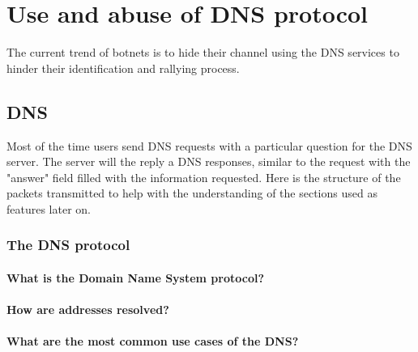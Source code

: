 \section{Use and abuse of DNS protocol}
The current trend of botnets is to hide their channel using the DNS services to hinder their identification and rallying process.\\

\subsection{DNS}


Most of the time users send DNS requests with a particular question for the DNS server. The server will the reply a DNS responses, similar to the request with the "answer" field filled with the information requested. Here is the structure of the packets transmitted to help with the understanding of the sections used as features later on.
\subsubsection{The DNS protocol}
\paragraph{What is the Domain Name System protocol?}
\paragraph{How are addresses resolved?}
\paragraph{What are the most common use cases of the DNS?}

\newpage
